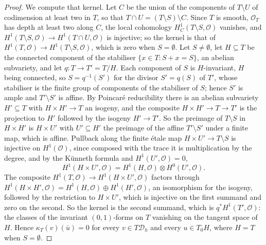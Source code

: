 \documentclass[11pt,reqno]{amsart}
\numberwithin{equation}{section}
\theoremstyle{plain}
\theoremstyle{definition}
\newcommand{\cD}{\mathcal{D}}
\begin{document}
\begin{proof}
We compute that kernel. Let $C$ be the union of the components of $T\setminus U$ of codimension at least two in $T$, so that $T\cap U=(T\setminus S)\setminus C$. Since $T$ is smooth, $\mathcal{O}_{T}$ has depth at least two along $C$, the local cohomology $H^{1}_{C}(T\setminus S,\mathcal{O})$ vanishes, and $H^{1}(T\setminus S,\mathcal{O})\to H^{1}(T\cap U,\mathcal{O})$ is injective; so the kernel is that of $H^{1}(T,\mathcal{O})\to H^{1}(T\setminus S,\mathcal{O})$, which is zero when $S=\emptyset$. Let $S\ne\emptyset$, let $H\subseteq T$ be the connected component of the stabiliser $\{x\in T:S+x=S\}$, an abelian subvariety, and let $q\colon T\to T'=T/H$. Each component of $S$ is $H$-invariant, $H$ being connected, so $S=q^{-1}(S')$ for the divisor $S'=q(S)$ of $T'$, whose stabiliser is the finite group of components of the stabiliser of $S$; hence $S'$ is ample \cite[\S6, Application~1]{Mum70} and $T'\setminus S'$ is affine. By Poincar\'e reducibility there is an abelian subvariety $H'\subseteq T$ with $H\times H'\to T$ an isogeny, and the composite $H\times H'\to T\to T'$ is the projection to $H'$ followed by the isogeny $H'\to T'$. So the preimage of $T\setminus S$ in $H\times H'$ is $H\times U'$ with $U'\subseteq H'$ the preimage of the affine $T'\setminus S'$ under a finite map, which is affine. Pullback along the finite \'etale map $H\times U'\to T\setminus S$ is injective on $H^{1}(\mathcal{O})$, since composed with the trace it is multiplication by the degree, and by the K\"unneth formula and $H^{1}(U',\mathcal{O})=0$,
\[
H^{1}(H\times U',\mathcal{O})=H^{1}(H,\mathcal{O})\otimes H^{0}(U',\mathcal{O}).
\]
The composite $H^{1}(T,\mathcal{O})\to H^{1}(H\times U',\mathcal{O})$ factors through $H^{1}(H\times H',\mathcal{O})=H^{1}(H,\mathcal{O})\oplus H^{1}(H',\mathcal{O})$, an isomorphism for the isogeny, followed by the restriction to $H\times U'$, which is injective on the first summand and zero on the second. So the kernel is the second summand, which is $q^{*}H^{1}(T',\mathcal{O})$: the classes of the invariant $(0,1)$-forms on $T$ vanishing on the tangent space of $H$. Hence $\kappa_{T}(v)(\bar u)=0$ for every $v\in T\cD_{h}$ and every $u\in T_{0}H$, where $H=T$ when $S=\emptyset$.


\end{proof}
\end{document}
